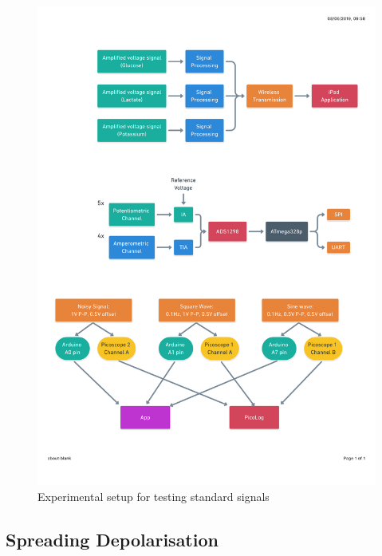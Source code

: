 \begin{figure}[h!]
\centering
\includegraphics[trim={0cm 0cm 0cm  0cm}, clip, width=.8\textwidth]{./figures/test1.pdf}
\captionsetup{justification=centering}
\caption{Experimental setup for testing standard signals}
\label{fig: test1}
\end{figure}


\subsection{Spreading Depolarisation}
